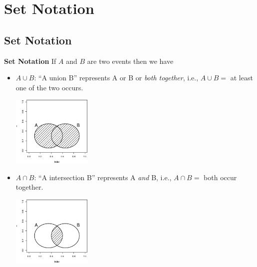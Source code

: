 \documentclass[compress]{beamer}        %
\makeatletter
\newcommand{\tcb}{\textcolor{beamer@blendedblue}}
\makeatother
\begin{document}
\section{Set Notation}
\subsection{Set Notation}
\begin{frame}{\bf \tcb{Set Notation}}
If $A$ and $B$ are two events then we have\\[0.2cm]
\begin{itemize}\itemsep0.2cm
\item {\boldmath$A \cup B$}: ``A union B'' represents A or B or \emph{both together}, i.e., $A \cup B =$ at least one of the two occurs.
    \begin{center}
    \includegraphics[width=0.3\textwidth, trim = 3.5cm 3.4cm 2.5cm 6cm, clip]{Union}
    \end{center}
\item {\boldmath$A \cap B$}: ``A intersection B'' represents A \emph{and} B, i.e., $A \cap B =$ both occur together.
    \begin{center}
    \includegraphics[width=0.3\textwidth, trim = 3.5cm 3.4cm 2.5cm 6cm, clip]{Intersect}
    \end{center}
\end{itemize}
\end{frame}
\end{document}
